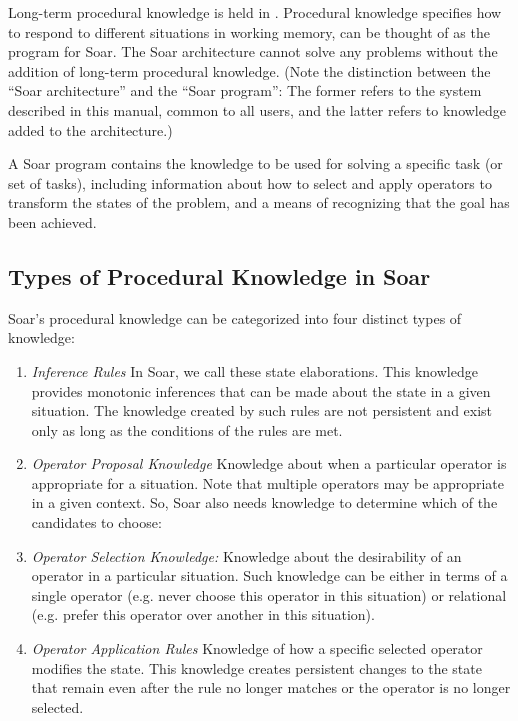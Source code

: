 Long-term procedural knowledge is held in . Procedural knowledge specifies how to respond to different
situations in working memory, can be thought of as the program for Soar. The Soar architecture cannot solve any problems without the addition of long-term procedural knowledge.  (Note the distinction between the ``Soar architecture'' and the ``Soar program'': The former refers to the system described in this manual, common to all users, and the latter refers to knowledge added to the architecture.)

A Soar program contains the knowledge to be used for solving a specific task (or set of tasks), including information about how to select and apply operators to transform the states of the problem, and a means of recognizing that the goal has been achieved.  

\subsection{Types of Procedural Knowledge in Soar}
\label{LIST:4KnowledgeTypes}

Soar's procedural knowledge can be categorized into  four distinct types of knowledge:

\vspace{-10pt} 
\begin{enumerate}
	\item \textit{Inference Rules} \newline 
		In Soar, we call these state elaborations. This knowledge provides monotonic inferences that can be made about the state in a given situation. The knowledge created by such rules are not persistent and exist only as long as the conditions of the rules are met.
	\vspace{-6pt}
	\item \textit{Operator Proposal Knowledge} \newline
		Knowledge about when a particular operator is appropriate for a situation. Note that multiple operators may be appropriate in a given context. So, Soar also needs knowledge to determine which of the candidates to choose:
		\vspace{-6pt}
	\item \textit{Operator Selection Knowledge:} \newline
		Knowledge about the desirability of an operator in a particular situation. Such knowledge can be either in terms of a single operator (e.g. never choose this operator in this situation) or relational (e.g. prefer this operator over another in this situation).
		\vspace{-6pt}
	\item \textit{Operator Application Rules} \newline
		Knowledge of how a specific selected operator modifies the state. This knowledge creates persistent changes to the state that remain even after the rule no longer matches or the operator is no longer selected.
		\vspace{-6pt}
\end{enumerate}

